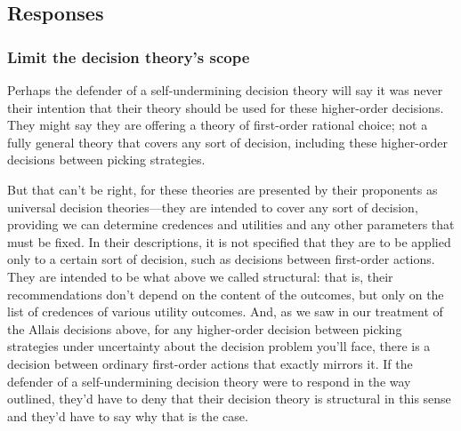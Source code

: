 \documentclass[a4paper,final]{article}
\newcommand{\todoold}[2][]{\todo[backgroundcolor=white,bordercolor=orange!10,linecolor=gray!10, #1,caption={},textcolor=gray]{Pre-rev: #2}}
\newcommand{\todooldinfo}[2][]{\todoold[#1]{#2}}
\newenvironment{CCM rewritten}
{\begingroup\color{blue}} %
{\endgroup}              %
\begin{document}


\subsection{Responses}

\subsubsection{Limit the decision theory's scope}

	Perhaps the defender of a self-undermining decision theory will say it was never their intention that their theory should be used for these higher-order decisions. They might say they are offering a theory of first-order rational choice; not a fully general theory that covers any sort of decision, including these higher-order decisions between picking strategies. 
	
But that can't be right, for these theories are presented by their proponents as universal decision theories---they are intended to cover any sort of decision, providing we can determine credences and utilities and any other parameters that must be fixed. In their descriptions, it is not specified that they are to be applied only to a certain sort of decision, such as decisions between first-order actions. They are intended to be what above we called structural: that is, their recommendations don't depend on the content of the outcomes, but only on the list of credences of various utility outcomes. And, as we saw in our treatment of the Allais decisions above, for any higher-order decision between picking strategies under uncertainty about the decision problem you'll face, there is a decision between ordinary first-order actions that exactly mirrors it. If the defender of a self-undermining decision theory were to respond in the way outlined, they'd have to deny that their decision theory is structural in this sense and they'd have to say why that is the case.
	
\end{document}
